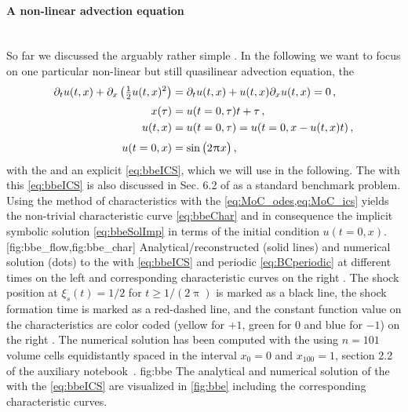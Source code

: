 \paragraph{A non-linear advection equation}\label{paragraph:BBE}\mbox{} \\
So far we discussed the arguably rather simple \laeq{}.
In the following we want to focus on one particular non-linear but still quasilinear advection equation, \viz{} the \bbe{}~\cite{Bateman1915,Burgers1948}
\begin{align}
	\partial_t u(t,x) +\partial_x\del[1]{\tfrac{1}{2}u(t,x)^2}&=\partial_t u(t,x) +u(t,x)\partial_x u(t,x)=0\, , \label{eq:bbe}\\[.25em]
	x(\tau)&=u(t=0,\tau)t+\tau\label{eq:bbeChar}\, ,\\
	u(t,x)&=u(t=0,\tau)=u(t=0,x-u(t,x) t)\label{eq:bbeSolImp}\, ,\\[.25em]
	u(t=0,x)&=\sin\del[1]{2\piu x},\label{eq:bbeICS}
\end{align}
with the \bbeq{} and an explicit \ic{} \eqref{eq:bbeICS}, which we will use in the following.
The \bbe{} with this \ic{} \eqref{eq:bbeICS} is also discussed in Sec. 6.2 of  as a standard benchmark problem.
Using the method of characteristics with the \cref{eq:MoC_odes,eq:MoC_ics} yields the non-trivial characteristic curve \eqref{eq:bbeChar} and 
in consequence the implicit symbolic solution \eqref{eq:bbeSolImp} in terms of the initial condition $u(t=0,x)$.
	[fig:bbe_flow,fig:bbe_char]%
	{%
	Analytical/reconstructed (solid lines) and numerical solution (dots) to the \bbe{} with \ic{} \eqref{eq:bbeICS} and periodic \bc{} \eqref{eq:BCperiodic} at different times on the left  and corresponding characteristic curves on the right .
	The shock position at $\xi_s(t)=1/2$ for $t\ge 1/(2\uppi)$ is marked as a black line, the shock formation time is marked as a red-dashed line, and the constant function value on the characteristics are color coded (yellow for $+1$, green for $0$ and blue for $-1$) on the right .
	The numerical solution has been computed with the \ktScheme{} using $n=101$ volume cells equidistantly spaced in the interval $x_0=0$ and $x_{100}=1$, \cf{} section 2.2 of the auxiliary notebook~\cite{Steil:2023PhDFVNB}.
	}%
	{fig:bbe}%
The analytical and numerical solution of the \bbe{} with the \ic{} \eqref{eq:bbeICS} are visualized in \cref{fig:bbe} including the corresponding characteristic curves.
